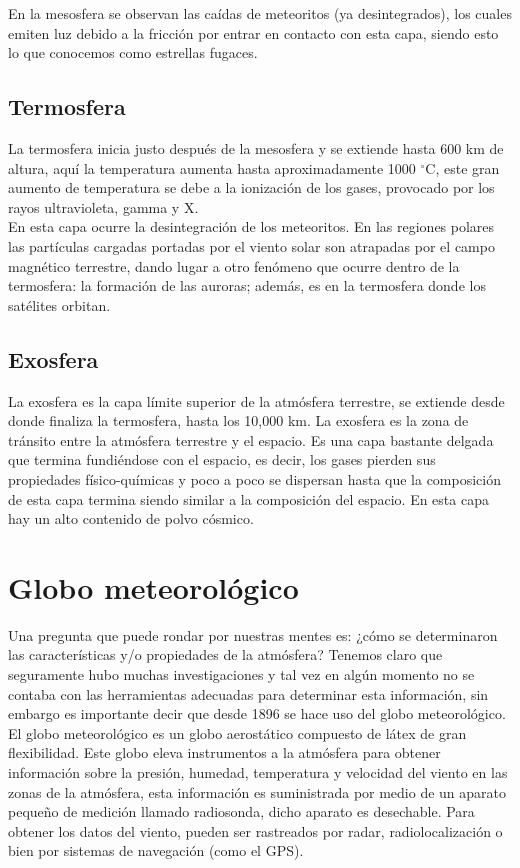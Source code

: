 \documentclass{article}
\begin{document}
\begin{doublespace}
En la mesosfera se observan las caídas de meteoritos (ya desintegrados), los cuales emiten luz debido a la fricción por entrar en contacto con esta capa, siendo esto lo que conocemos como estrellas fugaces.

\subsection{Termosfera}
La termosfera inicia justo después de la mesosfera y se extiende hasta 600 km de altura, aquí la temperatura aumenta hasta aproximadamente 1000 $^{\circ}$C, este gran aumento de temperatura se debe a la ionización de los gases, provocado por los rayos ultravioleta, gamma y X. 
\\

En esta capa ocurre la desintegración de los meteoritos. En las regiones polares las partículas cargadas portadas por el viento solar son atrapadas por el campo magnético terrestre, dando lugar a otro fenómeno que ocurre dentro de la termosfera: la formación de las auroras; además, es en la termosfera donde los satélites orbitan.
\subsection{Exosfera}
La exosfera es la capa límite superior de la atmósfera terrestre, se extiende desde donde finaliza la termosfera, hasta los 10,000 km. La exosfera es la zona de tránsito entre la atmósfera terrestre y el espacio. Es una capa bastante delgada que termina fundiéndose con el espacio, es decir, los gases pierden sus propiedades físico-químicas y poco a poco se dispersan hasta que la composición de esta capa termina siendo similar a la composición del espacio. En esta capa hay un alto contenido de polvo cósmico.

\section{Globo meteorológico}
Una pregunta que puede rondar por nuestras mentes es: ¿cómo se determinaron las características y/o propiedades de la atmósfera? Tenemos claro que seguramente hubo muchas investigaciones y tal vez en algún momento no se contaba con las herramientas adecuadas para determinar esta información, sin embargo es importante decir que desde 1896 se hace uso del globo meteorológico. 
\\

El globo meteorológico es un globo aerostático compuesto de látex de gran flexibilidad. Este globo eleva instrumentos a la atmósfera para obtener información sobre la presión, humedad, temperatura y velocidad del viento en las zonas de la atmósfera, esta información es suministrada por medio de un aparato pequeño de medición llamado radiosonda, dicho aparato es desechable. Para obtener los datos del viento, pueden ser rastreados por radar, radiolocalización o bien por sistemas de navegación (como el GPS).
\\


\end{doublespace}
\end{document}
